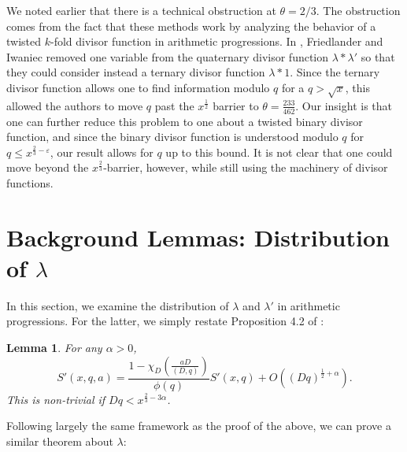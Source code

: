 \documentclass{amsart}
\newtheorem{lemma}[theorem]{Lemma}
\begin{document}
We noted earlier that there is a technical obstruction at $\theta=2/3$.  The obstruction comes from the fact that these methods work by analyzing the behavior of a twisted $k$-fold divisor function in arithmetic progressions.  In \cite{FI03}, Friedlander and Iwaniec removed one variable from the quaternary divisor function $\lambda\ast \lambda'$ so that they could consider instead a ternary divisor function $\lambda\ast 1$.  Since the ternary divisor function allows one to find information modulo $q$ for a $q>\sqrt x$, this allowed the authors to move $q$ past the $x^\frac 12$ barrier to $\theta=\frac{233}{462}$.  Our insight is that one can further reduce this problem to one about a twisted binary divisor function, and since the binary divisor function is understood modulo $q$ for $q\leq x^{\frac 23-\varepsilon}$, our result allows for $q$ up to this bound.  It is not clear that one could move beyond the $x^{\frac 23}$-barrier, however, while still using the machinery of divisor functions.

\section{Background Lemmas: Distribution of $\lambda$}\label{background1}

In this section, we examine the distribution of $\lambda$ and $\lambda'$ in arithmetic progressions.  For the latter, we simply restate Proposition 4.2 of \cite{FI03}:

\begin{lemma}\label{lambda'ap} For any $\alpha>0$,
$$S'(x,q,a)=\frac{1-\chi_D\left(\frac{aD}{(D,q)}\right)}{\phi(q)}S'(x,q)+O\left((Dq)^{\frac 12+\alpha}\right).$$
This is non-trivial if $Dq<x^{\frac 23-3\alpha}$.
\end{lemma}
Following largely the same framework as the \cite{FI03} proof of the above, we can prove a similar theorem about $\lambda$:
\end{document}
